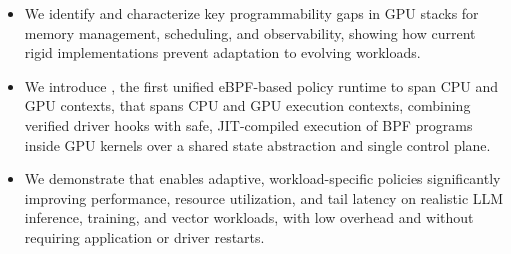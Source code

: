 \begin{itemize}[leftmargin=*,itemsep=0pt]
    \item We identify and characterize key programmability gaps in GPU stacks for memory management, scheduling, and observability, showing how current rigid implementations prevent adaptation to evolving workloads.
    \item We introduce \sys, the first unified eBPF-based policy runtime to span CPU and GPU contexts, that spans CPU and GPU execution contexts, combining verified driver hooks with safe, JIT-compiled execution of BPF programs inside GPU kernels over a shared state abstraction and single control plane.
    \item We demonstrate that \sys enables adaptive, workload-specific policies significantly improving performance, resource utilization, and tail latency on realistic LLM inference, training, and vector workloads, with low overhead and without requiring application or driver restarts.
\end{itemize}
